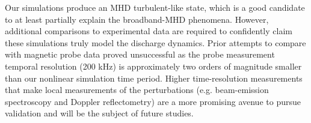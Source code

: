Our simulations produce an MHD turbulent-like state, which is a good candidate
to at least partially explain the broadband-MHD phenomena. However, additional
comparisons to experimental data are required to confidently claim these
simulations truly model the discharge dynamics. Prior attempts to compare with
magnetic probe data proved unsuccessful as the probe measurement temporal
resolution (200 kHz) is approximately two orders of magnitude smaller
than our nonlinear simulation time period. Higher time-resolution measurements
that make local measurements of the perturbations (e.g. beam-emission
spectroscopy and Doppler reflectometry) are a more promising avenue to pursue
validation and will be the subject of future studies.


